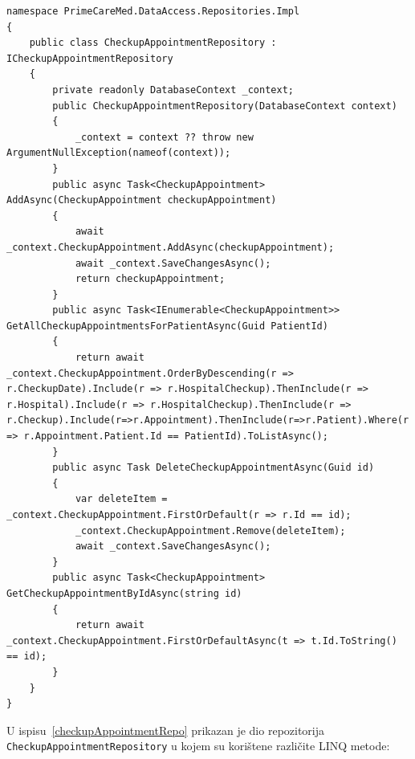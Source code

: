 \begin{lstlisting}[caption={\texttt{CheckupAppointment} repozitorij}, label=checkupAppointmentRepo]
namespace PrimeCareMed.DataAccess.Repositories.Impl
{
    public class CheckupAppointmentRepository : ICheckupAppointmentRepository
    {
        private readonly DatabaseContext _context;
        public CheckupAppointmentRepository(DatabaseContext context)
        {
            _context = context ?? throw new ArgumentNullException(nameof(context));
        }
        public async Task<CheckupAppointment> AddAsync(CheckupAppointment checkupAppointment)
        {
            await _context.CheckupAppointment.AddAsync(checkupAppointment);
            await _context.SaveChangesAsync();
            return checkupAppointment;
        }
        public async Task<IEnumerable<CheckupAppointment>> GetAllCheckupAppointmentsForPatientAsync(Guid PatientId)
        {
            return await _context.CheckupAppointment.OrderByDescending(r => r.CheckupDate).Include(r => r.HospitalCheckup).ThenInclude(r => r.Hospital).Include(r => r.HospitalCheckup).ThenInclude(r => r.Checkup).Include(r=>r.Appointment).ThenInclude(r=>r.Patient).Where(r => r.Appointment.Patient.Id == PatientId).ToListAsync();
        }
        public async Task DeleteCheckupAppointmentAsync(Guid id)
        {
            var deleteItem = _context.CheckupAppointment.FirstOrDefault(r => r.Id == id);
            _context.CheckupAppointment.Remove(deleteItem);
            await _context.SaveChangesAsync();
        }
        public async Task<CheckupAppointment> GetCheckupAppointmentByIdAsync(string id)
        {
            return await _context.CheckupAppointment.FirstOrDefaultAsync(t => t.Id.ToString() == id);
        }
    }
}
\end{lstlisting}

U ispisu~\ref{checkupAppointmentRepo} prikazan je dio repozitorija \texttt{CheckupAppointmentRepository} u kojem su korištene različite LINQ metode:

